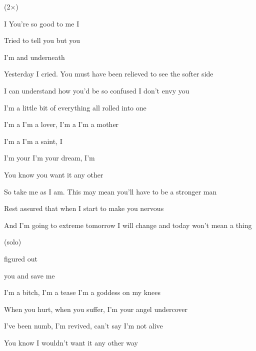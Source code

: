 
(2×)

   

\zs
I  
You're so good to me I
 

Tried to tell you but you 

I'm and  underneath 
 \ks

\zs
Yesterday I cried. You must have been relieved to see the softer side

I can understand how you'd be so confused I don't envy you

I'm a little bit of everything all rolled into one
\ks

\zr
I'm a  I'm a lover, I'm a  I'm a mother

I'm a  I'm a saint, I 

I'm your  I'm your dream, I'm 

You know you  want it any other 
\kr

\zs
So take me as I am. This may mean you'll have to be a stronger man

Rest assured that when I start to make you nervous

And I'm going to extreme tomorrow I will change and today won't mean a thing
\ks

\zr

\kr

\zr (solo) \kr

 figured out  

 you  and  save me

\zr
\kr

\zr
I'm a bitch, I'm a tease  I'm a goddess on my knees

When you hurt, when you suffer, I'm your angel undercover

I've been numb, I'm revived, can't say I'm not alive

You know I wouldn't want it any other way
\kr

        
      

\kp
